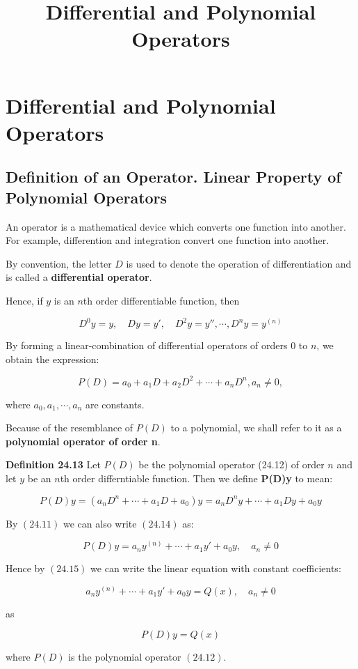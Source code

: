 \documentclass{article}
\title{Differential and Polynomial Operators}
\begin{document}
\section{Differential and Polynomial Operators}

\subsection{Definition of an Operator. Linear Property of Polynomial Operators}

An operator is a mathematical device which converts one function into another. For example, differention and integration convert one function into another.

By convention, the letter $D$ is used to denote the operation of differentiation and is called a \textbf{differential operator}.

Hence, if $y$ is an $n$th order differentiable function, then

\[ \tag{24.11} D^0 y = y,\quad Dy=y',\quad D^2 y = y'', \cdots,D^n y = y^{(n)} \] 

By forming a \@{linear-combination} of differential operators of orders 0 to $n$, we obtain the expression:

\[ \tag{24.12} P(D) = a_0 + a_1 D + a_2 D^2 + \cdots + a_n D^n, a_n \neq 0, \]

where $a_0, a_1, \cdots, a_n$ are constants.

Because of the resemblance of $P(D)$ to a polynomial, we shall refer to it as a \textbf{polynomial operator of order n}.

\textbf{Definition 24.13} Let $P(D)$ be the polynomial operator (24.12) of order $n$ and let $y$ be an $n$th order differntiable function. Then we define \textbf{P(D)y} to mean:

\[ \tag{24.14} P(D)y = (a_n D^n + \cdots + a_1 D + a_0)y = a_n D^n y + \cdots + a_1 D y + a_0 y \]

By $(24.11)$ we can also write $(24.14)$ as:

\[ \tag{24.15} P(D)y = a_n y^{(n)} + \cdots + a_1 y' + a_0 y,\quad a_n \neq 0 \]

Hence by $(24.15)$ we can write the linear equation with constant coefficients:

\[ \tag{24.16} a_n y^{(n)} + \cdots + a_1 y' + a_0 y = Q(x),\quad a_n \neq 0 \]

as

\[ \tag{24.17} P(D)y = Q(x) \]

where $P(D)$ is the polynomial operator $(24.12)$.
\end{document}
